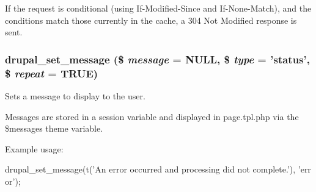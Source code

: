 If the request is conditional (using If-\/Modified-\/Since and If-\/None-\/Match), and the conditions match those currently in the cache, a 304 Not Modified response is sent. \hypertarget{bootstrap_8inc_ad9223d86c7b08b1288274ce211d9bfa6}{
\subsubsection[{drupal\_\-set\_\-message}]{\setlength{\rightskip}{0pt plus 5cm}drupal\_\-set\_\-message (\$ {\em message} = {\ttfamily NULL}, \/  \$ {\em type} = {\ttfamily 'status'}, \/  \$ {\em repeat} = {\ttfamily TRUE})}}
\label{bootstrap_8inc_ad9223d86c7b08b1288274ce211d9bfa6}
Sets a message to display to the user.

Messages are stored in a session variable and displayed in page.tpl.php via the \$messages theme variable.

Example usage: 
\begin{DoxyCode}
 drupal_set_message(t('An error occurred and processing did not complete.'), 'err
      or');
\end{DoxyCode}



